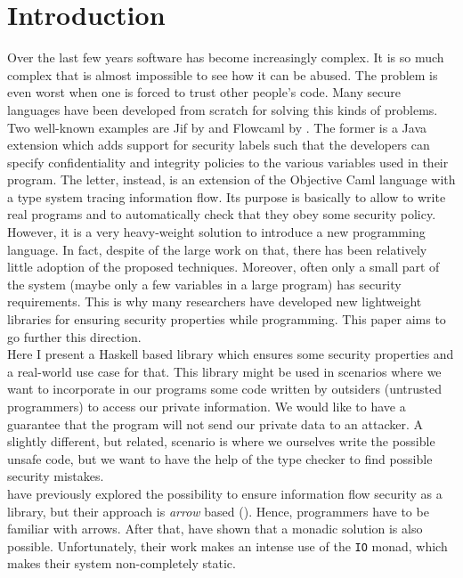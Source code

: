 \section{Introduction}
Over the last few years software has become increasingly complex. It is so much complex that is almost impossible to see how it can be abused. The problem is even worst when one is forced to trust other people's code. Many secure languages have been developed from scratch for solving this kinds of problems. Two well-known examples are Jif \cite{pullicino2014jif} by \citeauthor{pullicino2014jif} and Flowcaml \cite{simonet2003flow} by \citeauthor{simonet2003flow}. The former is a Java extension which adds support for security labels such that the developers can specify confidentiality and integrity policies to the various variables used in their program. The letter, instead, is an extension of the Objective Caml language with a type system tracing information flow. Its purpose is basically to allow to write real programs and to automatically check that they obey some security policy. \\
However, it is a very heavy-weight solution to introduce a new programming language. In fact, despite of the large work on that, there has been relatively little adoption of the proposed techniques. Moreover, often only a small part of the system (maybe only a few variables in a large program) has security requirements. This is why many researchers have developed new lightweight libraries for ensuring security properties while programming. This paper aims to go further this direction. \\
Here I present a Haskell based library which ensures some security properties and a real-world use case for that. This library might be used in scenarios where we want to incorporate in our programs some code written by outsiders (untrusted programmers) to access our private information. We would like to have a guarantee that the program will not send our private data to an attacker. A slightly different, but related, scenario is where we ourselves write the possible unsafe code, but we want to have the help of the type checker to find possible security mistakes. \\
\citeauthor{li2006encoding} \cite{li2006encoding} have previously explored the possibility to ensure information flow security as a library, but their approach is \textit{arrow} based (\cite{hughes2000generalising}). Hence, programmers have to be familiar with arrows. After that, \citeauthor{russo2008library} \cite{russo2008library} have shown that a monadic solution is also possible. Unfortunately, their work makes an intense use of the \texttt{IO} monad, which makes their system non-completely static. \\
